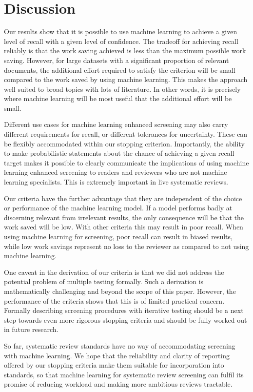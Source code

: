 \documentclass{bmcart}
\begin{document}
	\section*{Discussion}
	
	Our results show that it is possible to use machine learning to achieve a given level of recall with a given level of confidence. The tradeoff for achieving recall reliably is that the work saving achieved is less than the maximum possible work saving. However, for large datasets with a significant proportion of relevant documents, the additional effort required to satisfy the criterion will be small compared to the work saved by using machine learning. This makes the approach well suited to broad topics with lots of literature. In other words, it is precisely where machine learning will be most useful that the additional effort will be small.
	
	Different use cases for machine learning enhanced screening may also carry different requirements for recall, or different tolerances for uncertainty. These can be flexibly accommodated within our stopping criterion. Importantly, the ability to make probabilistic statements about the chance of achieving a given recall target makes it possible to clearly communicate the implications of using machine learning enhanced screening to readers and reviewers who are not machine learning specialists. This is extremely important in live systematic reviews.
	
	Our criteria have the further advantage that they are independent of the choice or performance of the machine learning model. If a model performs badly at discerning relevant from irrelevant results, the only consequence will be that the work saved will be low. With other criteria this may result in poor recall. 
	When using machine learning for screening, poor recall can result in biased results, while low work savings represent no loss to the reviewer as compared to not using machine learning.
	
	One caveat in the derivation of our criteria is that we did not address the potential problem of multiple testing formally. Such a derivation is mathematically challenging and beyond the scope of this paper. However, the performance of the criteria shows that this is of limited practical concern. Formally describing screening procedures with iterative testing should be a next step towards even more rigorous stopping criteria and should be fully worked out in future research.
	
	So far, systematic review standards have no way of accommodating screening with machine learning. 
	We hope that the reliability and clarity of reporting offered by our stopping criteria make them suitable for incorporation into standards, so that machine learning for systematic review screening can fulfil its promise of reducing workload and making more ambitious reviews tractable.
	
\end{document}
